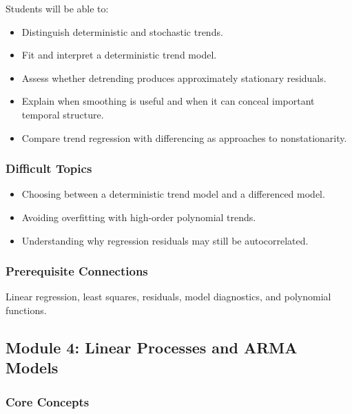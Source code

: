 \documentclass[11pt]{article}
\begin{document}
Students will be able to:

\begin{itemize}
    \item Distinguish deterministic and stochastic trends.
    \item Fit and interpret a deterministic trend model.
    \item Assess whether detrending produces approximately stationary residuals.
    \item Explain when smoothing is useful and when it can conceal important
    temporal structure.
    \item Compare trend regression with differencing as approaches to
    nonstationarity.
\end{itemize}

\subsubsection{Difficult Topics}

\begin{itemize}
    \item Choosing between a deterministic trend model and a differenced model.
    \item Avoiding overfitting with high-order polynomial trends.
    \item Understanding why regression residuals may still be autocorrelated.
\end{itemize}

\subsubsection{Prerequisite Connections}

Linear regression, least squares, residuals, model diagnostics, and
polynomial functions.

\subsection{Module 4: Linear Processes and ARMA Models}

\subsubsection{Core Concepts}
\end{document}
